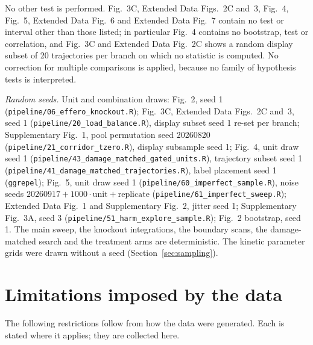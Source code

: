 \documentclass[11pt]{article}
\begin{document}
No other test is performed. Fig.~3C, Extended Data Figs.~2C and~3, Fig.~4, Fig.~5,
Extended Data Fig.~6 and Extended Data Fig.~7 contain no test or interval other than those listed; in
particular Fig.~4 contains no bootstrap, test or correlation, and Fig.~3C and Extended Data Fig.~2C shows a
random display subset of 20 trajectories per branch on which no statistic is computed.
No correction for multiple comparisons is applied, because no family of hypothesis
tests is interpreted.

\emph{Random seeds.} Unit and combination draws: Fig.~2, seed 1
(\texttt{pipeline/06\_effero\_knockout.R}); Fig.~3C, Extended Data Figs.~2C and~3,
seed 1 (\texttt{pipeline/20\_load\_balance.R}), display subset seed 1 re-set per branch;
Supplementary Fig.~1, pool permutation seed 20260820 (\texttt{pipeline/21\_corridor\_tzero.R}),
display subsample seed 1; Fig.~4, unit draw seed 1
(\texttt{pipeline/43\_damage\_matched\_gated\_units.R}), trajectory subset seed 1
(\texttt{pipeline/41\_damage\_matched\_trajectories.R}), label placement seed 1
(\texttt{ggrepel});
Fig.~5, unit draw seed 1 (\texttt{pipeline/60\_imperfect\_sample.R}), noise seeds
$20260917 + 1000\cdot\mathrm{unit} + \mathrm{replicate}$
(\texttt{pipeline/61\_imperfect\_sweep.R}); Extended Data Fig.~1 and Supplementary Fig.~2, jitter
seed 1; Supplementary Fig.~3A, seed 3 (\texttt{pipeline/51\_harm\_explore\_sample.R});
Fig.~2 bootstrap, seed 1. The main sweep, the knockout integrations,
the boundary scans, the damage-matched search and the treatment arms are deterministic.
The kinetic parameter grids were drawn without a seed (Section~\ref{sec:sampling}).

\section{Limitations imposed by the data}
\label{sec:limitations}

The following restrictions follow from how the data were generated. Each is stated
where it applies; they are collected here.
\end{document}
